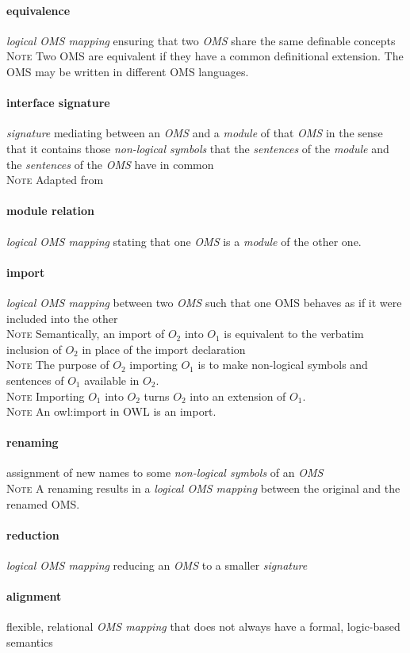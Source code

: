 \documentclass[10pt,%
\ifpretendfinal
final%
\else
draft%
\fi,
]{scrreprt}
\newcommand*{\termref}[1]{\textit{#1}}
\newcommand{\termdefinition}[2]{\paragraph{#1} #2}
\newenvironment{definitions}[0]{\medskip }{}
\newenvironment{note}[0]{\ \\ \textsc{Note} \quad}{}
\begin{document}
\begin{definitions}
  \termdefinition{equivalence}
{\termref{logical OMS mapping} ensuring that two \termref{OMS} share the
  same definable concepts}
  \begin{note}
    Two OMS are equivalent if they have a common definitional extension.
    The OMS may be written in different OMS languages.
  \end{note}

  \termdefinition{interface signature}{\termref{signature} mediating between an \termref{OMS} and a \termref{module} of that \termref{OMS} in the sense that it contains those \termref{non-logical symbols} that the \termref{sentences} of the \termref{module} and the \termref{sentences} of the \termref{OMS} have in common}
  \begin{note}
    Adapted from \cite{CuencaGrauEtAl:ExtractingModulesOntologies2007}
  \end{note}

  \termdefinition{module relation}{\termref{logical OMS mapping} stating that one \termref{OMS} is a \termref{module} of the other one.}

  \termdefinition{import}{\termref{logical OMS mapping} between two
    \termref{OMS} such that one OMS behaves as if it were
    included into the other}
  \begin{note}
Semantically, an import of $O_2$ into $O_1$ is equivalent to the verbatim inclusion of $O_2$ in place of the import declaration
  \end{note}
  \begin{note}
    The purpose of $O_2$ importing $O_1$ is to make non-logical symbols and sentences of $O_1$ available in $O_2$.
  \end{note}
  \begin{note}
    Importing $O_1$ into $O_2$ turns $O_2$ into an extension of $O_1$.
  \end{note}
  \begin{note}
    An owl:import in OWL is an import.
  \end{note}
  
  \termdefinition{renaming}{assignment of new names
   to some \termref{non-logical symbols} of an \termref{OMS}}
\begin{note}
A renaming results in a \termref{logical OMS mapping} between the
original and the renamed OMS.
\end{note}
  \termdefinition{reduction}{\termref{logical OMS mapping} reducing an \termref{OMS} to a smaller \termref{signature}}

  \termdefinition{alignment}{flexible, relational \termref{OMS mapping} that does not always have a formal, logic-based semantics}


\end{definitions}
\end{document}

